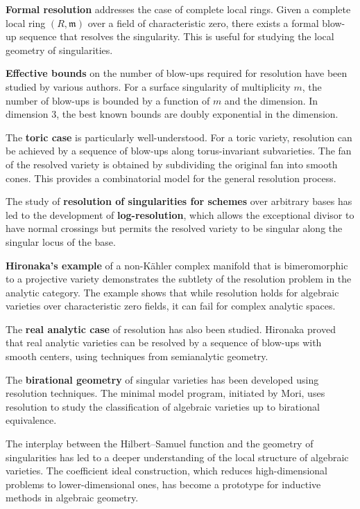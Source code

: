 \textbf{Formal resolution} addresses the case of complete local rings. Given a complete local ring $(R, \mathfrak{m})$ over a field of characteristic zero, there exists a formal blow-up sequence that resolves the singularity. This is useful for studying the local geometry of singularities.

\textbf{Effective bounds} on the number of blow-ups required for resolution have been studied by various authors. For a surface singularity of multiplicity $m$, the number of blow-ups is bounded by a function of $m$ and the dimension. In dimension 3, the best known bounds are doubly exponential in the dimension.

The \textbf{toric case} is particularly well-understood. For a toric variety, resolution can be achieved by a sequence of blow-ups along torus-invariant subvarieties. The fan of the resolved variety is obtained by subdividing the original fan into smooth cones. This provides a combinatorial model for the general resolution process.

The study of \textbf{resolution of singularities for schemes} over arbitrary bases has led to the development of \textbf{log-resolution}, which allows the exceptional divisor to have normal crossings but permits the resolved variety to be singular along the singular locus of the base.

\textbf{Hironaka's example} of a non-K\"ahler complex manifold that is bimeromorphic to a projective variety demonstrates the subtlety of the resolution problem in the analytic category. The example shows that while resolution holds for algebraic varieties over characteristic zero fields, it can fail for complex analytic spaces.

The \textbf{real analytic case} of resolution has also been studied. Hironaka proved that real analytic varieties can be resolved by a sequence of blow-ups with smooth centers, using techniques from semianalytic geometry.

The \textbf{birational geometry} of singular varieties has been developed using resolution techniques. The minimal model program, initiated by Mori, uses resolution to study the classification of algebraic varieties up to birational equivalence.

The interplay between the Hilbert--Samuel function and the geometry of singularities has led to a deeper understanding of the local structure of algebraic varieties. The coefficient ideal construction, which reduces high-dimensional problems to lower-dimensional ones, has become a prototype for inductive methods in algebraic geometry.

